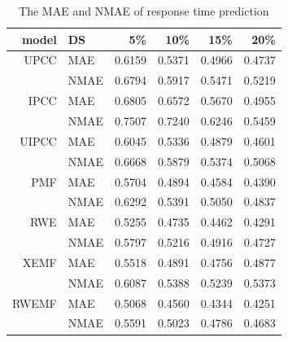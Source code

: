 \documentclass[conference]{IEEEtran}
\begin{document}
\begin{table}[H]
  \centering
  \caption{The MAE and NMAE of response time prediction}
  \label{tb_rt}
    \begin{tabular}{r||l|rrrr}
\hline
model & DS   & 5\%  & 10\% & 15\% & 20\% \\
\hline
UPCC & MAE  & 0.6159 & 0.5371 & 0.4966 & 0.4737 \\
         & NMAE & 0.6794 & 0.5917 & 0.5471 & 0.5219 \\
\hline
IPCC & MAE  & 0.6805 & 0.6572 & 0.5670 & 0.4955 \\
         & NMAE & 0.7507 & 0.7240 & 0.6246 & 0.5459 \\
\hline
UIPCC & MAE  & 0.6045 & 0.5336 & 0.4879 & 0.4601 \\
         & NMAE & 0.6668 & 0.5879 & 0.5374 & 0.5068 \\
\hline
PMF & MAE  & 0.5704 & 0.4894 & 0.4584 & 0.4390 \\
         & NMAE & 0.6292 & 0.5391 & 0.5050 & 0.4837 \\
\hline
RWE & MAE  & 0.5255 & 0.4735 & 0.4462 & 0.4291 \\
         & NMAE & 0.5797 & 0.5216 & 0.4916 & 0.4727 \\
\hline
XEMF & MAE  & 0.5518 & 0.4891 & 0.4756 & 0.4877 \\
         & NMAE & 0.6087 & 0.5388 & 0.5239 & 0.5373 \\
\hline
RWEMF & MAE  & 0.5068 & 0.4560 & 0.4344 & 0.4251 \\
         & NMAE & 0.5591 & 0.5023 & 0.4786 & 0.4683 \\
\hline
    \end{tabular}
\end{table}
\end{document}
